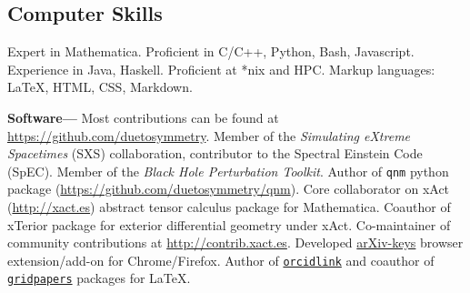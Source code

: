 \documentclass[margin,line]{res}
\begin{document}
\begin{resume}
  \section{\sc Computer Skills}
  Expert in {\sc Mathematica}.
  Proficient in C/C++, Python, Bash, Javascript.
  Experience in Java, Haskell.
  Proficient at *nix and HPC.
  Markup languages: \LaTeX, HTML, CSS, Markdown.


    {\bf Software---}%
  Most contributions can be found at \url{https://github.com/duetosymmetry}.
  Member of the {\it Simulating eXtreme Spacetimes} (SXS) collaboration,
  contributor to the Spectral Einstein Code (SpEC).
  Member of the {\it Black Hole Perturbation Toolkit}. Author of
    {\tt qnm} python package (\url{https://github.com/duetosymmetry/qnm}).
  Core collaborator on {\sc xAct} (\url{http://xact.es}) abstract
  tensor calculus package for {\sc  Mathematica}. Coauthor
  of {\sc xTerior} package for exterior differential geometry under
    {\sc xAct}. Co-maintainer of community contributions at
  \url{http://contrib.xact.es}. Developed
  \href{https://chrome.google.com/webstore/detail/arxiv-keys/fkjjdlbhliopfhgddlpoggpmpgjfaojd}{arXiv-keys}
  browser extension/add-on for Chrome/Firefox.
  Author of \href{https://ctan.org/pkg/orcidlink}{\tt orcidlink} and coauthor of \href{https://ctan.org/pkg/gridpapers}{\tt gridpapers} packages for \LaTeX.


  \ifx\nopubs\undefined
    
  \else
  \fi

  

  \newpage{}


\end{resume}
\end{document}
